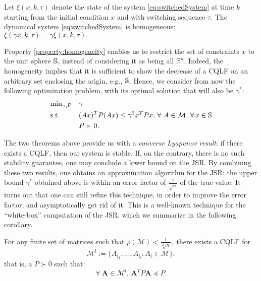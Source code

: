 
\begin{property}\label{property:homogeneity}
Let $\xi(x, k, \tau)$ denote the state of the system \eqref{eq:switchedSystem} at time $k$ starting from the initial condition $x$ and with switching sequence $\tau$. The dynamical system \eqref{eq:switchedSystem} is homogeneous: $\xi(\gamma x, k, \tau)= \gamma \xi(x, k, \tau).$
\end{property}

Property \ref{property:homogeneity} enables us to restrict the set of constraints $x$ to the unit sphere $\mathbb{S}$, instead of considering it as being all $\mathbb{R}^n$. Indeed, the homogeneity implies that it is sufficient to show the decrease of a CQLF on an arbitrary set enclosing the origin, e.g., $\mathbb{S}$. Hence, we consider from now the following optimization problem, with its optimal solution that will also be $\gamma^{*}$:
\begin{equation}\label{eqn:campiOpt1}
\begin{aligned}
& \text{min}_{\gamma, P} & & \gamma \\
& \text{s.t.} 
&  & (Ax)^TP(Ax) \leq \gamma^2 x^TPx,\,\forall\ A \in \mathcal{M}, \,\forall\, x \in \mathbb{S}\\
& && P \succ 0. \\
\end{aligned}
\end{equation}


The two theorems above provide us with a \emph{converse Lyapunov result}: if there exists a CQLF, then our system is stable. If, on the contrary, there is no such stability guarantee, one may conclude a lower bound on the JSR. By combining these two results, one obtains an approximation algorithm for the JSR: the upper bound $\gamma^*$ obtained above is within an error factor of $\frac{1}{\sqrt{n}}$ of the true value. It turns out that one can still refine this technique, in order to improve the error factor, and asymptotically get rid of it. This is a well-known technique for the ``white-box'' computation of the JSR, which we summarize in the following corollary.

\begin{cor}\label{cor:approx-products}
For any finite set of matrices such that $\rho(\mathcal{M}) < \frac{1}{\sqrt[2l]{n}},$ there exists a CQLF for $$\mathcal{M}^l:=\{A_{i_1},\dots, A_{i_{l}}: A_i \in \mathcal{M}\},$$ that is, a $P\succ 0$ such that: $$\forall\ \mathbf{A} \in \mathcal{M}^l,\, \mathbf{A}^T P \mathbf{A} \preceq P. $$
\end{cor}

